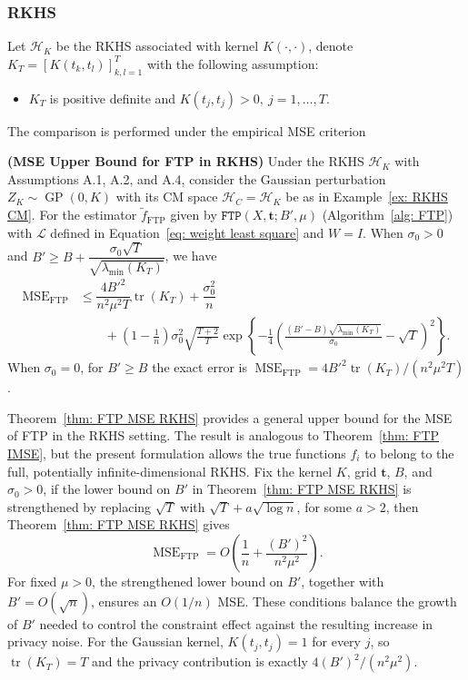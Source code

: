 \documentclass[twoside,11pt]{article}
\newcommand{\SqBra}[1]{\left[{#1}\right]} %
\begin{document}
\subsubsection{RKHS}
Let $\mathcal{H}_K$ be the RKHS associated with kernel $K(\cdot,\cdot)$, denote
$K_T = \SqBra{K(t_k,t_l)}_{k,l = 1}^T$ 
with the following assumption:
\begin{itemize}
    \item [\textbf{A.4}] $K_T$ is positive definite and $K(t_j,t_j)>0,\ j=1,\ldots,T$.
\end{itemize}
The comparison is performed under the empirical MSE criterion
\begin{theorem}\textup{\textbf{(MSE Upper Bound for FTP in RKHS)}}
    Under the RKHS $\mathcal{H}_K$ with Assumptions A.1, A.2, and A.4, consider the Gaussian perturbation $Z_K\sim \operatorname{GP}(0,K)$ with its CM space $\mathcal{H}_C = \mathcal{H}_K$ be as in Example~\ref{ex: RKHS CM}. For the estimator $\widetilde{f}_{\mathrm{FTP}}$ given by $\mathtt{FTP}(X, \mathbf{t}; B',\mu)$ (Algorithm~\ref{alg: FTP}) with $\mathcal{L}$ defined in Equation~\eqref{eq: weight least square} and $W = I$. When $\sigma_0>0$ and $B'\geq B + \dfrac{\sigma_0\sqrt{T}}{\sqrt{\lambda_{\min}(K_T)}}$, we have
    \begin{align*}
        \mathrm{MSE}_{\mathrm{FTP}}
        &\leq \dfrac{4{B'}^2}{n^2\mu^2 T} \operatorname{tr}(K_T)
        + \dfrac{\sigma_0^2}{n}\\
        &\qquad + \left(1-\frac1n\right)
        \sigma_0^2
        \sqrt{\frac{T+2}{T}}
        \exp\left\{
        -\frac14
        \left(
        \frac{(B'-B)\sqrt{\lambda_{\min}(K_T)}}{\sigma_0}
        -\sqrt{T}
        \right)^2
        \right\}.
    \end{align*}
    When $\sigma_0=0$, for $B'\ge B$ the exact error is $\operatorname{MSE}_{\mathrm{FTP}}=4{B'}^2\operatorname{tr}(K_T)/(n^2\mu^2T)$.
    \label{thm: FTP MSE RKHS}
\end{theorem}
Theorem~\ref{thm: FTP MSE RKHS} provides a general upper bound for the MSE of FTP in the RKHS setting. The result is analogous to Theorem~\ref{thm: FTP IMSE}, but the present formulation allows the true functions $f_i$ to belong to the full, potentially infinite-dimensional RKHS. Fix the kernel $K$, grid $\mathbf t$, $B$, and $\sigma_0>0$, if the lower bound on $B'$ in
Theorem~\ref{thm: FTP MSE RKHS} is strengthened by replacing $\sqrt T$
with $\sqrt T+a\sqrt{\log n}$, for some $a>2$, then Theorem~\ref{thm: FTP MSE RKHS} gives
\[
\operatorname{MSE}_{\mathrm{FTP}}
=
O\!\left(\frac1n+\frac{(B')^2}{n^2\mu^2}\right).\]
For fixed $\mu>0$, the strengthened lower bound on $B'$, together with $B'=O(\sqrt n)$, ensures an $O(1/n)$ MSE. These conditions balance the growth of $B'$ needed to
control the constraint effect against the resulting increase in privacy noise. For the Gaussian kernel, $K(t_j,t_j)=1$ for every $j$, so $\operatorname{tr}(K_T)=T$ and the privacy contribution is exactly $4(B')^2/(n^2\mu^2)$.
\end{document}
